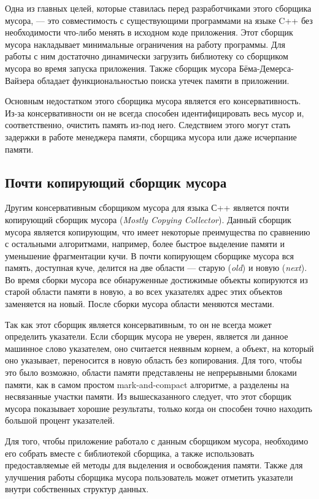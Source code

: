 \documentclass[14pt]{matmex-diploma}
\begin{document}
Одна из главных целей, которые ставилась перед разработчиками этого сборщика мусора, --- это совместимость с существующими программами на языке C++ без необходимости что-либо менять в исходном коде приложения. Этот сборщик  мусора накладывает минимальные ограничения на работу программы. Для работы с ним достаточно динамически загрузить библиотеку со сборщиком мусора во время запуска приложения. Также сборщик мусора Бёма-Демерса-Вайзера обладает функциональностью поиска утечек памяти в приложении.

Основным недостатком этого сборщика мусора является его консервативность. Из-за консервативности он не всегда способен идентифицировать весь мусор и, соответственно, очистить память из-под него. Следствием этого могут стать задержки в работе менеджера памяти, сборщика мусора или даже исчерпание памяти. 

\subsection{Почти копирующий сборщик мусора}
Другим консервативным сборщиком мусора для языка С++ является почти копирующий сборщик мусора (\textit{Mostly Copying Collector})\cite{mcc1, mcc2}. 
Данный сборщик мусора является копирующим, что имеет некоторые преимущества по сравнению с остальными алгоритмами, например, более быстрое выделение памяти и уменьшение фрагментации кучи. В почти копирующем сборщике мусора вся память, доступная куче, делится на две области --- старую (\textit{old}) и новую (\textit{next}). Во время сборки мусора все обнаруженные достижимые объекты копируются из старой области памяти в новую, а во всех указателях адрес этих объектов заменяется на новый. После сборки мусора области меняются местами. 

Так как этот сборщик является консервативным, то он не всегда может определить указатели. Если сборщик мусора не уверен, является ли данное машинное слово указателем, оно считается неявным корнем, а объект, на который оно указывает, переносится в новую область без копирования. Для того, чтобы это было возможно, области памяти представлены не непрерывными блоками памяти, как в самом простом mark-and-compact алгоритме\cite{lisp-copy}, а разделены на несвязанные участки памяти. Из вышесказанного следует, что этот сборщик мусора показывает хорошие результаты, только когда он способен точно находить большой процент указателей.

Для того, чтобы приложение работало с данным сборщиком мусора, необходимо его собрать вместе с библиотекой сборщика, а также использовать предоставляемые ей методы для выделения и освобождения памяти. Также для улучшения работы сборщика мусора пользователь может отметить указатели внутри собственных структур данных.
\end{document}
